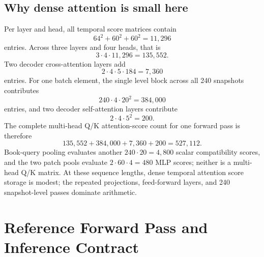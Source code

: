 \documentclass[10pt,letterpaper]{article}
\numberwithin{equation}{section}
\theoremstyle{definition}
\theoremstyle{remark}
\begin{document}
\subsection{Why dense attention is small here}

Per layer and head, all temporal score matrices contain
\begin{equation}
64^2+60^2+60^2=11{,}296
\label{eq:encoder-score-count}
\end{equation}
entries. Across three layers and four heads, that is
\begin{equation}
3\cdot4\cdot11{,}296=135{,}552.
\label{eq:all-encoder-scores}
\end{equation}
Two decoder cross-attention layers add
\begin{equation}
2\cdot4\cdot5\cdot184=7{,}360
\label{eq:decoder-score-count}
\end{equation}
entries. For one batch element, the single level block across all 240
snapshots contributes
\begin{equation}
240\cdot4\cdot20^2=384{,}000
\label{eq:level-score-count}
\end{equation}
entries, and two decoder self-attention layers contribute
\begin{equation}
2\cdot4\cdot5^2=200.
\label{eq:decoder-self-score-count}
\end{equation}
The complete multi-head Q/K attention-score count for one forward pass is
therefore
\begin{equation}
135{,}552+384{,}000+7{,}360+200=527{,}112.
\label{eq:total-score-count}
\end{equation}
Book-query pooling evaluates another \(240\cdot20=4{,}800\) scalar
compatibility scores, and the two patch pools evaluate
\(2\cdot60\cdot4=480\) MLP scores; neither is a multi-head Q/K matrix. At
these sequence lengths, dense temporal attention score storage is modest;
the repeated projections, feed-forward layers, and 240 snapshot-level passes
dominate arithmetic.

\section{Reference Forward Pass and Inference Contract}
\end{document}
